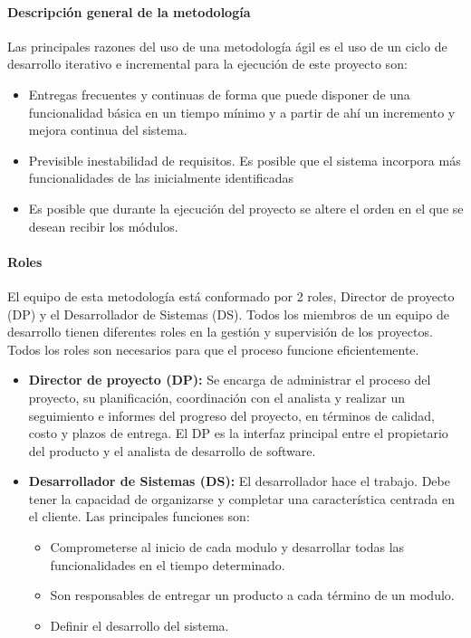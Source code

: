 \documentclass[12pt,a4paper,final]{article}
\begin{document}
	\paragraph{Descripción general de la metodología}
	Las principales razones del uso de una metodología ágil es el uso de un ciclo de desarrollo iterativo e incremental para la ejecución de este proyecto son:
	
	\begin{itemize}
		\item Entregas frecuentes y continuas de forma que puede disponer de una funcionalidad básica en un tiempo mínimo y a partir de ahí un incremento y mejora continua del sistema.
		
		\item Previsible inestabilidad de requisitos. Es posible que el sistema incorpora más funcionalidades de las inicialmente identificadas
		
		\item Es posible que durante la ejecución del proyecto se altere el orden en el que se desean recibir los módulos.
	\end{itemize} 
	
	\paragraph{Roles}
	
	El equipo de esta metodología está conformado por 2 roles, Director de proyecto (DP) y el Desarrollador de Sistemas (DS). Todos los miembros de un equipo de desarrollo tienen diferentes roles en la gestión y supervisión de los proyectos. Todos los roles son necesarios para que el proceso funcione eficientemente. 
	
	\begin{itemize}
		\item \textbf{Director de proyecto (DP):} Se encarga de administrar el proceso del proyecto, su planificación, coordinación con el analista y realizar un seguimiento e informes del progreso del proyecto, en términos de calidad, costo y plazos de entrega. El DP es la interfaz principal entre el propietario del producto y el analista de desarrollo de software.
		
		\item \textbf{Desarrollador de Sistemas (DS):} El desarrollador hace el trabajo. Debe tener la capacidad de organizarse y completar una característica centrada en el cliente. Las principales funciones son:
		
		\begin{itemize}
			\item Comprometerse al inicio de cada modulo y desarrollar todas las funcionalidades en el tiempo determinado.
			
			\item Son responsables de entregar un producto a cada término de un modulo.
			
			\item Definir el desarrollo del sistema.
		\end{itemize} 
	\end{itemize}
\end{document}
